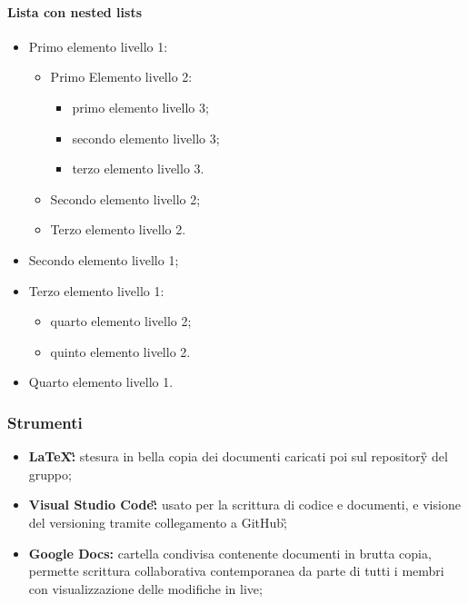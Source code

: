 		\paragraph*{Lista con nested lists}
		\begin{itemize}
			\item Primo elemento livello 1:
			\begin{itemize}
				\item Primo Elemento livello 2:
				\begin{itemize}
					\item primo elemento  livello 3;
					\item secondo elemento livello 3;
					\item terzo elemento livello 3.
				\end{itemize}
				\item Secondo elemento livello 2;
				\item Terzo elemento livello 2.
			\end{itemize}
			\item Secondo elemento livello 1;
			\item Terzo elemento livello 1:
			\begin{itemize}
				\item quarto elemento livello 2;
				\item quinto elemento livello 2.
			\end{itemize}
			\item Quarto elemento livello 1.
		\end{itemize}
		
		\subsubsection{Strumenti}
			\begin{itemize}
				\item \textbf{\LaTeX\G:} stesura in bella copia dei documenti caricati poi sul repository\G{} del gruppo;
				\item \textbf{Visual Studio Code\G:} usato per la scrittura di codice e documenti, e visione del versioning tramite collegamento a GitHub\G;
				\item \textbf{Google Docs:} cartella condivisa contenente documenti in brutta copia, permette scrittura collaborativa contemporanea da parte di tutti i membri con visualizzazione delle modifiche in live;
			\end{itemize}

